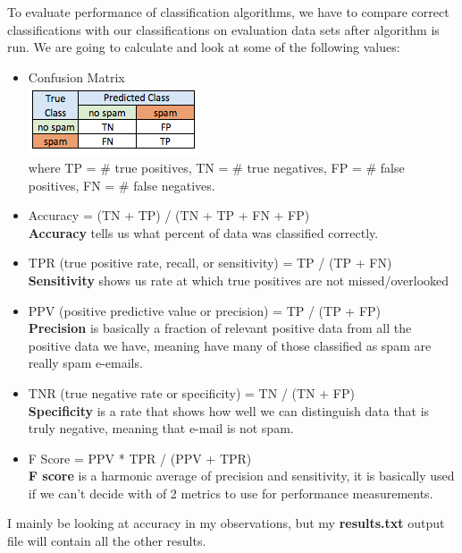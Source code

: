 \documentclass[12pt, letterpaper]{article}
\begin{document}
\begin{enumerate}[label=\Roman*.]
	To evaluate performance of  classification algorithms, we have to compare correct classifications with our classifications on evaluation data sets after algorithm is run. We are going to calculate and look at some of the following values: 
	\begin{itemize}
		\item Confusion Matrix \\
		{\center \includegraphics[scale=1]{5.png} \\}
		where TP = \# true positives, TN = \# true negatives, FP = \# false positives, FN = \# false negatives.\\
		\item Accuracy = (TN + TP) / (TN + TP + FN + FP)\\
		{\bf Accuracy} tells us what percent of data was classified correctly. \\
		\item TPR (true positive rate, recall, or sensitivity) = TP / (TP + FN)\\
		{\bf Sensitivity} shows us rate at which true positives are not missed/overlooked \\
		\item PPV (positive predictive value or precision) = TP / (TP + FP)\\
		{\bf Precision} is basically a fraction of relevant positive data from all the positive data we have, meaning have many of those classified as spam are really spam e-emails. \\ 
		\item TNR (true negative rate or specificity) = TN / (TN + FP)\\
		{\bf Specificity} is a rate that shows how well we can distinguish data that is truly negative, meaning that e-mail is not spam.\\
		\item F Score = PPV * TPR / (PPV + TPR)\\
		{\bf F score} is a harmonic average of precision and sensitivity, it is basically used if we can't decide with of 2 metrics to use for performance measurements. \\
	\end{itemize}
	 I mainly be looking at accuracy in my observations, but my {\bf results.txt} output file will contain all the other results.\\
	 

\end{enumerate}
\end{document}
